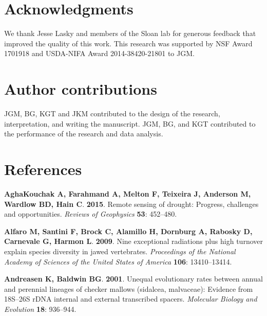 \documentclass[man,floatsintext]{apa6}
\theoremstyle{definition}
\theoremstyle{definition}
\theoremstyle{definition}
\theoremstyle{remark}
\begin{document}
\hypertarget{acknowledgments}{%
\section{Acknowledgments}\label{acknowledgments}}

We thank Jesse Lasky and members of the Sloan lab for generous feedback
that improved the quality of this work. This research was supported by
NSF Award 1701918 and USDA-NIFA Award 2014-38420-21801 to JGM.

\hypertarget{author-contributions}{%
\section{Author contributions}\label{author-contributions}}

JGM, BG, KGT and JKM contributed to the design of the research,
interpretation, and writing the manuscript. JGM, BG, and KGT contributed
to the performance of the research and data analysis.

\hypertarget{references}{%
\section{References}\label{references}}

\newpage

\begingroup
\setlength{\parindent}{-0.5in}
\setlength{\leftskip}{0.5in}

\hypertarget{refs}{}
\leavevmode\hypertarget{ref-aghakouchak2015remote}{}%
\textbf{\textnormal{AghaKouchak A}, \textnormal{Farahmand A},
\textnormal{Melton F}, \textnormal{Teixeira J}, \textnormal{Anderson M},
\textnormal{Wardlow BD}, \textnormal{Hain C}}. \textbf{2015}. Remote
sensing of drought: Progress, challenges and opportunities.
\emph{Reviews of Geophysics} \textbf{53}: 452--480.

\leavevmode\hypertarget{ref-R-geiger_a}{}%
\textbf{\textnormal{Alfaro M}, \textnormal{Santini F}, \textnormal{Brock
C}, \textnormal{Alamillo H}, \textnormal{Dornburg A},
\textnormal{Rabosky D}, \textnormal{Carnevale G}, \textnormal{Harmon
L}}. \textbf{2009}. Nine exceptional radiations plus high turnover
explain species diversity in jawed vertebrates. \emph{Proceedings of the
National Academy of Sciences of the United States of America}
\textbf{106}: 13410--13414.

\leavevmode\hypertarget{ref-andreasen2001unequal}{}%
\textbf{\textnormal{Andreasen K}, \textnormal{Baldwin BG}}.
\textbf{2001}. Unequal evolutionary rates between annual and perennial
lineages of checker mallows (sidalcea, malvaceae): Evidence from
18S--26S rDNA internal and external transcribed spacers. \emph{Molecular
Biology and Evolution} \textbf{18}: 936--944.
\end{document}
